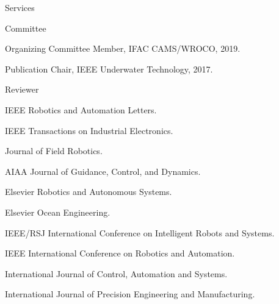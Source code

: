 \begin{rSection}{Services}


\begin{rSubsection}{Committee}{}{}{}
  \item Organizing Committee Member, IFAC CAMS/WROCO, 2019.

  \item Publication Chair, IEEE Underwater Technology, 2017.




\end{rSubsection}

\begin{rSubsection}{Reviewer}{}{}{}
  \item IEEE Robotics and Automation Letters.
  \item IEEE Transactions on Industrial Electronics.
  \item Journal of Field Robotics.
  \item AIAA Journal of Guidance, Control, and Dynamics.
  \item Elsevier Robotics and Autonomous Systems.
  \item Elsevier Ocean Engineering.
  \item IEEE/RSJ International Conference on Intelligent Robots and Systems.
  \item IEEE International Conference on Robotics and Automation.
  \item International Journal of Control, Automation and Systems.
  \item International Journal of Precision Engineering and Manufacturing.
\end{rSubsection}

\end{rSection}
